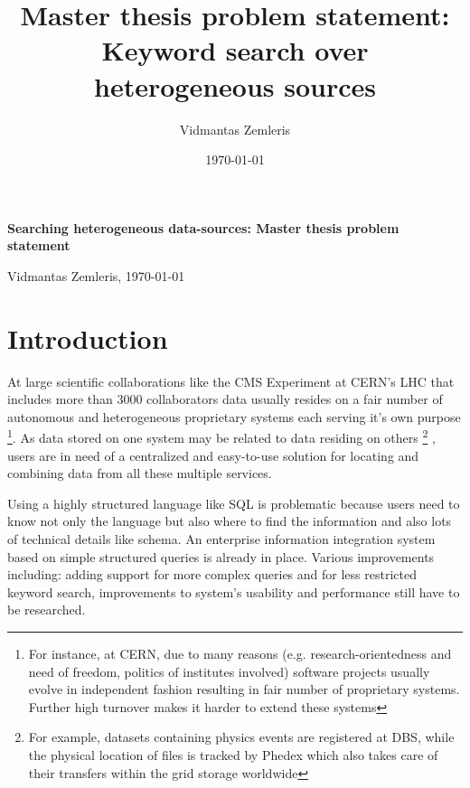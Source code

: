 \documentclass[a4paper,11pt,draft]{article}
\begin{document}
\addtolength{\textheight}{10mm}

 
\title{Master thesis problem statement: Keyword search over heterogeneous sources} %
\author{Vidmantas Zemleris}  %
\date{\today}  %
 

%
 \centerline{\Large \bf Searching heterogeneous data-sources: Master thesis problem statement} %
 \medskip
 
 \centerline{Vidmantas Zemleris, \today}  %
 \medskip
 


 
\section{Introduction}
At large scientific collaborations like the CMS Experiment at CERN's LHC that includes more than 3000 collaborators data usually resides on a fair number of autonomous and heterogeneous proprietary systems each serving it's own purpose
\footnote{For instance, at CERN,  due to many reasons (e.g. research-orientedness and need of freedom, politics of institutes involved) software projects usually evolve in independent fashion resulting in fair number of proprietary systems\cite{Koch00CERN}. Further high turnover makes it harder to extend these systems}. As data stored on one system may be related to data residing on others%
	\footnote{For example, datasets containing physics events are registered at DBS, while the physical location of files is tracked by Phedex which also takes care of their transfers within the grid storage worldwide}%
, users are in need of a centralized and easy-to-use solution for locating and combining data from all these multiple services.

Using a highly structured language like SQL is problematic because users need to know not only the language but also where to find the information and also lots of technical details like schema. An enterprise information integration system based on simple structured queries is already in place. Various improvements including: adding support for more complex queries and for less restricted keyword search, improvements to system's usability and performance still have to be researched.
\end{document}
